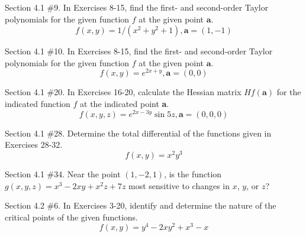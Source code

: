 \documentclass[12pt,letterpaper]{hmcpset}
\begin{document}

\begin{problem}
Section 4.1 \#9. In Exercises 8-15, find the first- and second-order Taylor polynomials for the given function $f$ at the given point $\textbf{a}$.\\
$$ f(x, y) = 1/(x^2 + y^2 + 1), \textbf{a} = (1, -1) $$
\end{problem}

\newpage

\begin{problem}
Section 4.1 \#10. In Exercises 8-15, find the first- and second-order Taylor polynomials for the given function $f$ at the given point $\textbf{a}$.\\
$$ f(x, y) = e^{2x+y}, \textbf{a} = (0, 0) $$
\end{problem}

\newpage

\begin{problem}
Section 4.1 \#20. In Exercises 16-20, calculate the Hessian matrix $Hf( \textbf{a} )$ for the indicated function $f$ at the indicated point \textbf{a}.\\
$$ f(x, y, z) = e^{2x-3y} \sin{5z}, \textbf{a} = (0, 0, 0) $$
\end{problem}

\newpage

\begin{problem}
Section 4.1 \#28. Determine the total differential of the functions given in Exercises 28-32.\\
$$ f(x, y) = x^2 y^3$$
\end{problem}

\newpage

\begin{problem}
Section 4.1 \#34. Near the point $(1, -2, 1)$, is the function $g(x, y, z) = x^3 - 2xy + x^2 z + 7z$ most sensitive to changes in $x$, $y$, or $z$?
\end{problem}

\newpage

\begin{problem}
Section 4.2 \#6. In Exercises 3-20, identify and determine the nature of the critical points of the given functions.\\
$$ f(x, y) = y^4 - 2xy^2 + x^3 - x $$
\end{problem}
\end{document}
